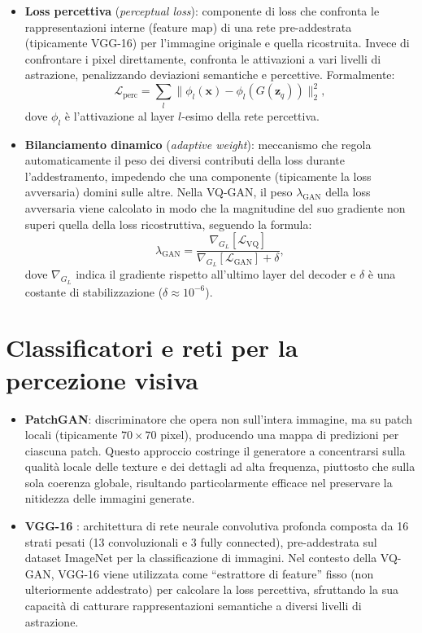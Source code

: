 \begin{itemize}
	$$
		\mathcal{L}_{\text{GAN}}(G, D) = \mathbb{E}_{\mathbf{x} \sim p_{\text{data}}}[\log D(\mathbf{x})] + \mathbb{E}_{\mathbf{z}_q \sim p_{\mathcal{Z}}}[\log(1 - D(G(\mathbf{z}_q)))].
	$$
	\item \textbf{Loss percettiva} (\emph{perceptual loss}): componente di loss che confronta le rappresentazioni interne (feature map) di una rete pre-addestrata (tipicamente VGG-16) per l'immagine originale e quella ricostruita. Invece di confrontare i pixel direttamente, confronta le attivazioni a vari livelli di astrazione, penalizzando deviazioni semantiche e percettive. Formalmente: 
	$$
		\mathcal{L}_{\text{perc}} = \sum_{l} \|\phi_l(\mathbf{x}) - \phi_l(G(\mathbf{z}_q))\|_2^2,
	$$
	dove $\phi_l$ è l'attivazione al layer $l$-esimo della rete percettiva.
	\item \textbf{Bilanciamento dinamico} (\emph{adaptive weight}): meccanismo che regola automaticamente il peso dei diversi contributi della loss durante l'addestramento, impedendo che una componente (tipicamente la loss avversaria) domini sulle altre. Nella VQ-GAN, il peso $\lambda_{\text{GAN}}$ della loss avversaria viene calcolato in modo che la magnitudine del suo gradiente non superi quella della loss ricostruttiva, seguendo la formula: 
	$$
		\lambda_{\text{GAN}} = \frac{\nabla_{G_L}[\mathcal{L}_{\text{VQ}}]}{\nabla_{G_L}[\mathcal{L}_{\text{GAN}}] + \delta},
	$$
	dove $\nabla_{G_L}$ indica il gradiente rispetto all'ultimo layer del decoder e $\delta$ è una costante di stabilizzazione ($\delta \approx 10^{-6}$).
\end{itemize}

\section{Classificatori e reti per la percezione visiva}
\label{sec:def-classificatori}
\begin{itemize}
	\item \textbf{PatchGAN}: discriminatore che opera non sull'intera immagine, ma su patch locali (tipicamente $70 \times 70$ pixel), producendo una mappa di predizioni per ciascuna patch. Questo approccio costringe il generatore a concentrarsi sulla qualità locale delle texture e dei dettagli ad alta frequenza, piuttosto che sulla sola coerenza globale, risultando particolarmente efficace nel preservare la nitidezza delle immagini generate.
	\item \textbf{VGG-16} \cite{simonyan-2015}: architettura di rete neurale convolutiva profonda composta da 16 strati pesati (13 convoluzionali e 3 fully connected), pre-addestrata sul dataset ImageNet per la classificazione di immagini. Nel contesto della VQ-GAN, VGG-16 viene utilizzata come ``estrattore di feature'' fisso (non ulteriormente addestrato) per calcolare la loss percettiva, sfruttando la sua capacità di catturare rappresentazioni semantiche a diversi livelli di astrazione.
\end{itemize}

